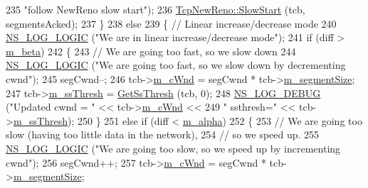\begin{DoxyCode}
235                             \textcolor{stringliteral}{"follow NewReno slow start"});
236               \hyperlink{classns3_1_1TcpNewReno_a1cf5fd9585eb3b745727f4f5beae0706}{TcpNewReno::SlowStart} (tcb, segmentsAcked);
237             \}
238           \textcolor{keywordflow}{else}
239             \{     \textcolor{comment}{// Linear increase/decrease mode}
240               \hyperlink{group__logging_ga88acd260151caf2db9c0fc84997f45ce}{NS\_LOG\_LOGIC} (\textcolor{stringliteral}{"We are in linear increase/decrease mode"});
241               \textcolor{keywordflow}{if} (diff > \hyperlink{classns3_1_1TcpVegas_a5871bf3ef55a392819a26c80f8c0a87f}{m\_beta})
242                 \{
243                   \textcolor{comment}{// We are going too fast, so we slow down}
244                   \hyperlink{group__logging_ga88acd260151caf2db9c0fc84997f45ce}{NS\_LOG\_LOGIC} (\textcolor{stringliteral}{"We are going too fast, so we slow down by decrementing cwnd"});
245                   segCwnd--;
246                   tcb->\hyperlink{classns3_1_1TcpSocketState_a7cd3d2156a483c1db436097477a0fd7f}{m\_cWnd} = segCwnd * tcb->\hyperlink{classns3_1_1TcpSocketState_a079872f7b0099ef5f3cab4ff47bd2edd}{m\_segmentSize};
247                   tcb->\hyperlink{classns3_1_1TcpSocketState_aec003b6dba9d269bfb1036c7652ffbd6}{m\_ssThresh} = \hyperlink{classns3_1_1TcpVegas_af42952eb204ae641900b1d0ef4d39d97}{GetSsThresh} (tcb, 0);
248                   \hyperlink{group__logging_ga413f1886406d49f59a6a0a89b77b4d0a}{NS\_LOG\_DEBUG} (\textcolor{stringliteral}{"Updated cwnd = "} << tcb->\hyperlink{classns3_1_1TcpSocketState_a7cd3d2156a483c1db436097477a0fd7f}{m\_cWnd} <<
249                                 \textcolor{stringliteral}{" ssthresh="} << tcb->\hyperlink{classns3_1_1TcpSocketState_aec003b6dba9d269bfb1036c7652ffbd6}{m\_ssThresh});
250                 \}
251               \textcolor{keywordflow}{else} \textcolor{keywordflow}{if} (diff < \hyperlink{classns3_1_1TcpVegas_a50cf33c05a6dd0e6a8da11e741291de8}{m\_alpha})
252                 \{
253                   \textcolor{comment}{// We are going too slow (having too little data in the network),}
254                   \textcolor{comment}{// so we speed up.}
255                   \hyperlink{group__logging_ga88acd260151caf2db9c0fc84997f45ce}{NS\_LOG\_LOGIC} (\textcolor{stringliteral}{"We are going too slow, so we speed up by incrementing cwnd"});
256                   segCwnd++;
257                   tcb->\hyperlink{classns3_1_1TcpSocketState_a7cd3d2156a483c1db436097477a0fd7f}{m\_cWnd} = segCwnd * tcb->\hyperlink{classns3_1_1TcpSocketState_a079872f7b0099ef5f3cab4ff47bd2edd}{m\_segmentSize};

\end{DoxyCode}
